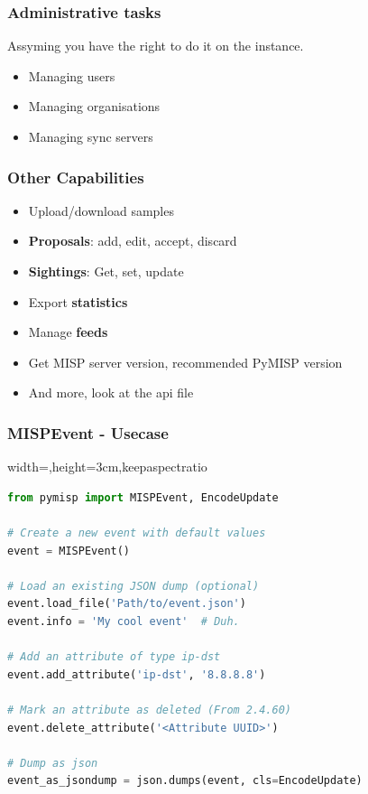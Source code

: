 \begin{frame}
    \frametitle{Administrative tasks}
    Assyming you have the right to do it on the instance.
    \begin{itemize}
        \item Managing users
        \item Managing organisations
        \item Managing sync servers
    \end{itemize}
\end{frame}

\begin{frame}[fragile]
    \frametitle{Other Capabilities}
    \begin{itemize}
        \item Upload/download samples
        \item {\bf Proposals}: add, edit, accept, discard
        \item {\bf Sightings}: Get, set, update
        \item Export {\bf statistics}
        \item Manage {\bf feeds}
        \item Get MISP server version, recommended PyMISP version
        \item And more, look at the api file
    \end{itemize}
\end{frame}

\begin{frame}[fragile]
    \frametitle{MISPEvent - Usecase}
    \begin{adjustbox}{width=\textwidth,height=3cm,keepaspectratio}
        \begin{lstlisting}[language=Python,firstnumber=1]
from pymisp import MISPEvent, EncodeUpdate

# Create a new event with default values
event = MISPEvent()

# Load an existing JSON dump (optional)
event.load_file('Path/to/event.json')
event.info = 'My cool event'  # Duh.

# Add an attribute of type ip-dst
event.add_attribute('ip-dst', '8.8.8.8')

# Mark an attribute as deleted (From 2.4.60)
event.delete_attribute('<Attribute UUID>')

# Dump as json
event_as_jsondump = json.dumps(event, cls=EncodeUpdate)
        \end{lstlisting}
    \end{adjustbox}
\end{frame}

